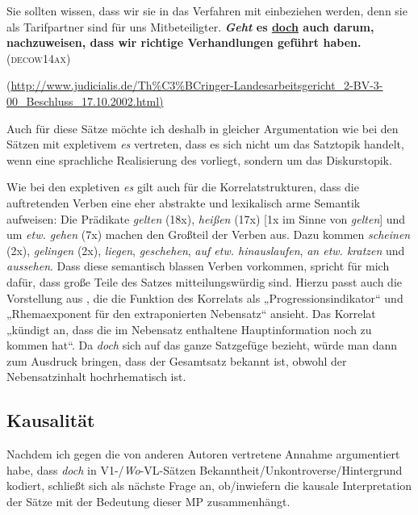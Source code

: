 \begin{exe}
	\ex\label{1021} 

	Sie sollten wissen, dass wir sie in das Verfahren mit einbeziehen werden, denn sie als Tarifpartner sind für uns Mitbeteiligter. \textbf{\textit{Geht} 		es \ul{doch} auch darum, nachzuweisen, dass wir richtige Verhandlungen geführt haben.}
	\newline\hbox{}\hfill\hbox{\scshape(decow14ax)}\begin{sloppypar}{\scriptsize(\url{http://www.judicialis.de/Th\%C3\%BCringer-Landesarbeitsgericht\_2-BV-3-00\_Beschluss\_17.10.2002.html)}}\end{sloppypar}
\end{exe}
Auch für diese Sätze möchte ich deshalb in gleicher Argumentation wie bei den Sätzen mit expletivem \textit{es} vertreten, dass es sich nicht um das Satztopik  handelt, wenn eine sprachliche Realisierung des  vorliegt, sondern um das Diskurstopik.

Wie bei den expletiven \textit{es} gilt auch für die Korrelatstrukturen, dass die auftretenden Verben eine eher abstrakte und lexikalisch arme Semantik aufweisen: Die Prädikate \textit{gelten} (18x), \textit{heißen} (17x) [1x im Sinne von \textit{gelten}] und um \textit{etw. gehen} (7x) machen den Großteil der Verben aus. Dazu kommen \textit{scheinen} (2x), \textit{gelingen} (2x), \textit{liegen}, \textit{geschehen}, \textit{auf etw. hinauslaufen}, \textit{an etw. kratzen} und \textit{aussehen}. Dass diese semantisch blassen Verben vorkommen, spricht für mich dafür, dass große Teile des Satzes mitteilungswürdig sind. Hierzu passt auch die Vorstellung aus \citet[153]{Zitterbart2002}, die die Funktion des Korrelats als „Progressionsindikator“ und „Rhemaexponent für den extraponierten Nebensatz“ ansieht. Das Korrelat „kündigt an, dass die im Nebensatz enthaltene Hauptinformation noch zu kommen hat“. Da \textit{doch} sich auf das ganze Satzgefüge bezieht, würde man dann zum Ausdruck bringen, dass der Gesamtsatz bekannt ist, obwohl der Nebensatzinhalt hochrhematisch  ist.

\subsection{Kausalität}
Nachdem ich gegen die von anderen Autoren vertretene Annahme argumentiert habe, dass \textit{doch} in V1-/\textit{Wo}-VL-Sätzen Bekanntheit/Unkontroverse/Hintergrund kodiert, schließt sich als nächste Frage an, ob/inwiefern die kausale Interpretation der Sätze mit der Bedeutung dieser MP zusammenhängt. 

